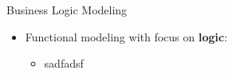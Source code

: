 \begin{Slide}{Business Logic Modeling}
\begin{itemize}
\item Functional modeling with focus on \textbf{logic}:
\begin{itemize}
\item sadfadsf

\end{itemize}
\end{itemize}
\end{Slide}